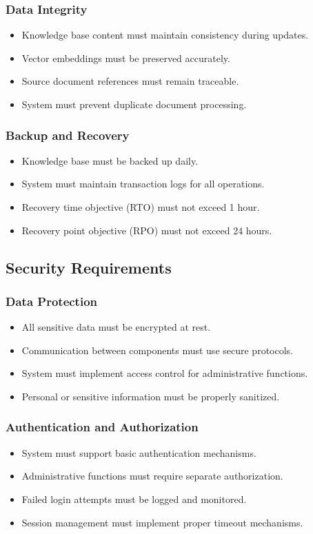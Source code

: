 \documentclass[12pt,a4paper]{report}
\begin{document}
\subsubsection{Data Integrity}
\begin{itemize}
    \item Knowledge base content must maintain consistency during updates.
    \item Vector embeddings must be preserved accurately.
    \item Source document references must remain traceable.
    \item System must prevent duplicate document processing.
\end{itemize}

\subsubsection{Backup and Recovery}
\begin{itemize}
    \item Knowledge base must be backed up daily.
    \item System must maintain transaction logs for all operations.
    \item Recovery time objective (RTO) must not exceed 1 hour.
    \item Recovery point objective (RPO) must not exceed 24 hours.
\end{itemize}

\subsection{Security Requirements}

\subsubsection{Data Protection}
\begin{itemize}
    \item All sensitive data must be encrypted at rest.
    \item Communication between components must use secure protocols.
    \item System must implement access control for administrative functions.
    \item Personal or sensitive information must be properly sanitized.
\end{itemize}

\subsubsection{Authentication and Authorization}
\begin{itemize}
    \item System must support basic authentication mechanisms.
    \item Administrative functions must require separate authorization.
    \item Failed login attempts must be logged and monitored.
    \item Session management must implement proper timeout mechanisms.
\end{itemize}
\end{document}
